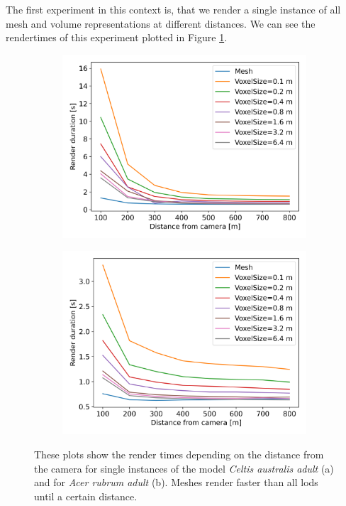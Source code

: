 The first experiment in this context is, that we render a single instance of all mesh and volume representations at different distances.
We can see the rendertimes of this experiment plotted in Figure \ref{fig:render_time_comparisons}.
\begin{figure}[ht]
    \centering
    \begin{subfigure}[b]{0.49\linewidth}
        \centering
        \includegraphics[width=1\linewidth]{img/results/render_durations_EU06a.png}
        \caption{}
    \end{subfigure}
    \begin{subfigure}[b]{0.49\linewidth}
        \centering
        \includegraphics[width=1\linewidth]{img/results/render_durations_EA01a.png}
        \caption{}
    \end{subfigure}
	\caption[Plots of the render times depending on the distance from the camera.]{These plots show the render times depending on the distance from the camera for single instances of the model \textit{Celtis australis adult} (a) and for \textit{Acer rubrum adult} (b). Meshes render faster than all \acsp{lod} until a certain distance.}
	\label{fig:render_time_comparisons}
\end{figure}
